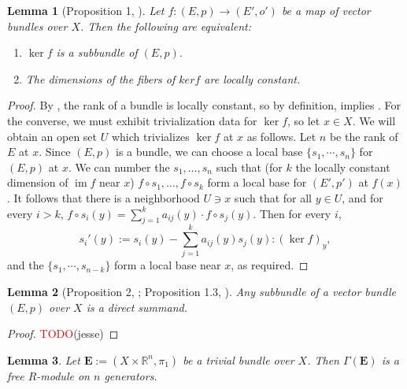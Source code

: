 \documentclass[11pt]{article}
\newcommand{\R}{\mathbb{R}}
\newcommand{\remph}[1]{\textcolor{red}{#1}}
\newcommand{\TODO}{\remph{TODO}}
\newcommand{\im}{\operatorname{im}}
\renewcommand{\ker}{\operatorname{ker}}
\theoremstyle{plain}
\newtheorem{lemma}{Lemma}[section]
\theoremstyle{definition}
\begin{document}
\begin{lemma}[Proposition 1, \cite{swan1962vector}]\label{lemma:proposition-1}
  Let \(f : (E,p) \to (E',o')\) be a map of vector bundles over \(X\). Then the following are equivalent:
  \begin{enumerate}[label={(\alph*)}]
  \item \label{lemma:proposition-1-1} \(\ker f\) is a subbundle of \((E,p)\). 
  \item \label{lemma:proposition-1-2} The dimensions of the fibers of \(ker f\) are locally constant.
  \end{enumerate}
\end{lemma}
\begin{proof}
  By , the rank of a bundle is locally constant, so by definition,  implies . For the converse, we must exhibit trivialization data for \(\ker f\), so let \(x \in X\). We will obtain an open set \(U\) which trivializes \(\ker f\) at \(x\) as follows. Let \(n\) be the rank of \(E\) at \(x\). Since \((E,p)\) is a bundle, we can choose a local base \(\{s_1, \cdots, s_n\}\) for \((E,p)\) at \(x\). We can number the \(s_1, \dots, s_n\) such that (for \(k\) the locally constant dimension of \(\im f\) near \(x\)) \(f \circ s_1, \dots, f \circ s_k\) form a local base for \((E',p')\) at \(f(x)\). It follows that there is a neighborhood \(U \ni x\) such that for all \(y \in U\), and for every \(i > k\), \(f \circ s_i(y) = \sum_{j = 1}^k a_{ij}(y) \cdot f \circ s_j(y).\) Then for every \(i\),
  \[s_i'(y) := s_i(y) - \sum_{j = 1}^k a_{ij}(y)s_j(y) : (\ker f)_y,\]
  and the $\{s_1, \cdots, s_{n - k}\}$ form a local base near \(x\), as required.
\end{proof}
\begin{lemma}[Proposition 2, \cite{swan1962vector}; Proposition 1.3, \cite{hatcher2003vector}] \label{lemma:proposition-2}
  Any subbundle of a vector bundle \((E,p)\) over \(X\) is a direct summand.
\end{lemma}

\begin{proof}
  \TODO(jesse)
\end{proof}

\begin{lemma}\label{lemma:global-sections-trivial-fg}
  Let \(\mathbf{E} := (X \times \R^n, \pi_1)\) be a trivial bundle over \(X\). Then \(\Gamma(\mathbf{E})\) is a free \(R\)-module on \(n\) generators.
\end{lemma}
\end{document}
